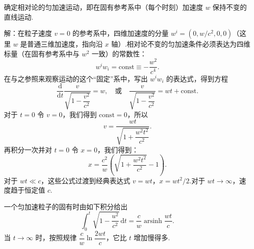 \begin{xiti}

\quad 确定相对论的匀加速运动，即在固有参考系中（每个时刻）加速度 $w$ 保持不变的直线运动.

解：在粒子速度 $v=0$ 的参考系中，四维加速度的分量 $w^i=(0,w/c^2,0,0)$（这里 $w$ 是普通三维加速度，指向沿 $x$ 轴）.相对论不变的匀加速条件必须表达为四维标量（在固有参考系中与 $w^2$ 一致）的常数性：
\begin{equation*}
  w^iw_i=\mathrm{const}\equiv-\frac{w^2}{c^4}.
\end{equation*}
在与之参照来观察运动的这个“固定”系中，写出 $w^iw_i$ 的表达式，得到方程
\begin{equation*}
  \frac{\mathrm{d}}{\mathrm{d}t}\frac{v}{\sqrt{1-\dfrac{v^2}{c^2}}}=w,\quad
  \text{或}\quad
  \frac{v}{\sqrt{1-\dfrac{v^2}{c^2}}}=wt+\mathrm{const}.
\end{equation*}
对于 $t=0$ 令 $v=0$，我们得到 $\mathrm{const}=0$，所以
\begin{equation*}
  v=\frac{wt}{\sqrt{1+\dfrac{w^2t^2}{c^2}}}.
\end{equation*}
再积分一次并对 $t=0$ 令 $x=0$，我们得到：
\begin{equation*}
  x=\frac{c^2}{w}\left(\sqrt{1+\frac{w^2t^2}{c^2}}-1\right).
\end{equation*}
对于 $wt\ll c$，这些公式过渡到经典表达式 $v=wt$，$x=wt^2/2$.对于 $wt\to\infty$，速度趋于恒定值 $c$.

一个匀加速粒子的固有时由如下积分给出
\begin{equation*}
  \int_0^t\sqrt{1-\frac{u^2}{c^2}}\,\mathrm{d}t
  =\frac{c}{w}\operatorname{arsinh}\frac{wt}{c}.
\end{equation*}
当 $t\to\infty$ 时，按照规律 $\dfrac{c}{w}\ln\dfrac{2wt}{c}$，它比 $t$ 增加慢得多.

\end{xiti}
